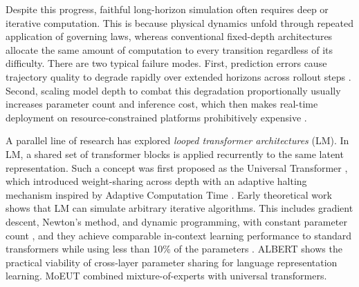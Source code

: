 \documentclass{article} %
\begin{document}
Despite this progress, faithful long-horizon simulation often requires deep or iterative computation. This is because physical dynamics unfold through repeated application of governing laws, whereas conventional fixed-depth architectures allocate the same amount of computation to every transition regardless of its difficulty. There are two typical failure modes. First, prediction errors cause trajectory quality to degrade rapidly over extended horizons across rollout steps \citep{xiao2019compoundingerror, talvitie2017self, lambert2022survey}. Second, scaling model depth to combat this degradation proportionally usually increases parameter count and inference cost, which then makes real-time deployment on resource-constrained platforms prohibitively expensive \citep{wang2025wmadsurvey, hafner2025dreamerv3}.

A parallel line of research has explored \emph{looped transformer architectures} (LM). In LM, a shared set of transformer blocks is applied recurrently to the same latent representation. Such a concept was first proposed as the Universal Transformer \citep{dehghani2019universal}, which introduced weight-sharing across depth with an adaptive halting mechanism inspired by Adaptive Computation Time \citep{graves2016act}. Early theoretical work shows that LM can simulate arbitrary iterative algorithms. This includes gradient descent, Newton's method, and dynamic programming, with constant parameter count \citep{giannou2023programmable}, and they achieve comparable in-context learning performance to standard transformers while using less than 10\% of the parameters \citep{yang2023looped}. ALBERT \citep{lan2020albert} shows the practical viability of cross-layer parameter sharing for language representation learning. MoEUT \citep{csordas2024moeut} combined mixture-of-experts with universal transformers.
\end{document}
